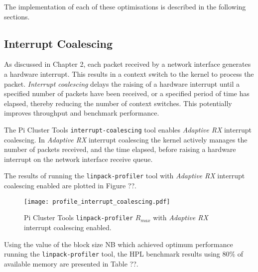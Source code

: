 The implementation of each of these optimisations is described in the following sections.


%
%
\subsection{Interrupt Coalescing}

As discussed in Chapter 2, each packet received by a network interface generates a hardware interrupt. This results in a context switch to the kernel to process the packet. \emph{Interrupt coalescing} delays the raising of a hardware interrupt until a specified number of packets have been received, or a specified period of time has elapsed, thereby reducing the number of context switches. This potentially improves throughput and benchmark performance.

The Pi Cluster Tools \verb|interrupt-coalescing| tool enables \emph{Adaptive RX} interrupt coalescing. In \emph{Adaptive RX} interrupt coalescing the kernel actively manages the number of packets received, and the time elapsed, before raising a hardware interrupt on the network interface receive queue.

The results of running the \verb|linpack-profiler| tool with \emph{Adaptive RX} interrupt coalescing enabled are plotted in Figure ??.

\begin{figure}[h]
	\centering
	\texttt{[image: profile\_interrupt\_coalescing.pdf]}
	\caption{Pi Cluster Tools \texttt{linpack-profiler} $R_{max}$ with \emph{Adaptive RX} interrupt coalescing enabled.}
	\label{fig:subim1}
\end{figure}

Using the value of the block size NB which achieved optimum performance running the \texttt{linpack-profiler} tool, the HPL benchmark results using 80\% of available memory are presented in Table ??. 

